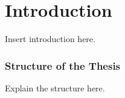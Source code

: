 \chapter*{Introduction}

Insert introduction here.


\subsection*{Structure of the Thesis}

Explain the structure here.




